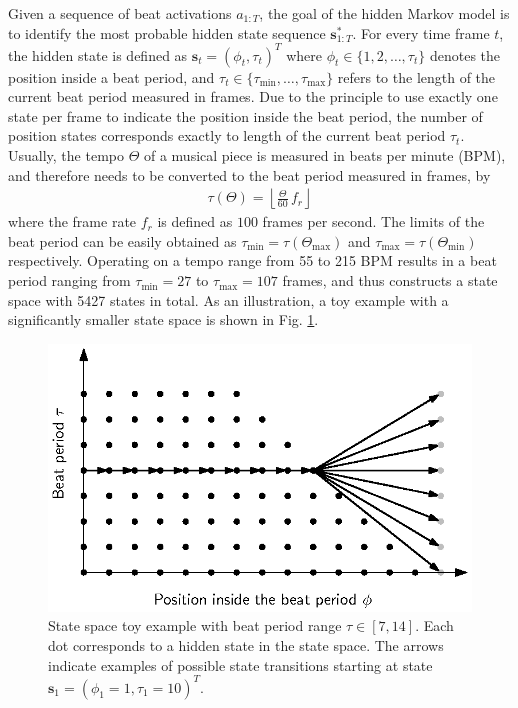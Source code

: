 \documentclass{scrartcl}
\begin{document}
Given a sequence of beat activations $a_{1:T}$, the goal of the hidden Markov model is to identify the most probable hidden state sequence $\mathbf s_{1:T}^*$. For every time frame $t$, the hidden state is defined as $\mathbf s_t = (\phi_t, \tau_t)^T$ where $\phi_t \in \{1, 2, \dots, \tau_t\}$ denotes the position inside a beat period, and $\tau_t \in \{ \tau_{\text{min}}, \dots, \tau_{\text{max}}\}$ refers to the length of the current beat period measured in frames. Due to the principle to use exactly one state per frame to indicate the position inside the beat period, the number of position states corresponds exactly to length of the current beat period $\tau_t$. Usually, the tempo $\Theta$ of a musical piece is measured in beats per minute (BPM), and therefore needs to be converted to the beat period measured in frames, by
\begin{align}
\tau(\Theta) = \left\lfloor \frac{\Theta}{60}\, f_r \right\rfloor 
\label{eq:number_of_obstervations_per_bar}
\end{align} 
where the frame rate $f_r$ is defined as $100$ frames per second. The limits of the beat period can be easily obtained as $\tau_\text{min} = \tau(\Theta_\text{max})$ and $\tau_\text{max} =\tau(\Theta_\text{min})$ respectively. Operating on a tempo range from 55 to 215 BPM results in a beat period ranging from $\tau_\text{min} = 27$ to $\tau_\text{max} = 107$ frames, and thus constructs a state space with 5427 states in total. As an illustration, a toy example with a significantly smaller state space  is shown in Fig. \ref{fig:state_space}.

\begin{figure}[htbp]
\centering
\includegraphics[scale=1.0]{figures/state_space.eps}
\caption{State space toy example with beat period range $\tau \in [7, 14]$.  Each dot corresponds to a hidden state in the state space. The arrows indicate examples of possible state transitions starting at state $\mathbf s_1 = (\phi_1=1, \tau_1=10)^T$.}
\label{fig:state_space}
\end{figure}    
\end{document}

